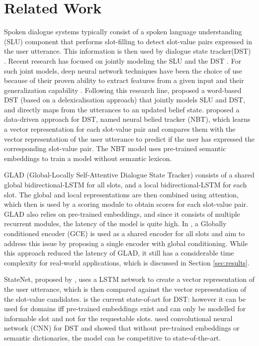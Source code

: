 \documentclass{article}
\begin{document}
\section{Related Work}
\label{sec:rel_work}
Spoken dialogue systems typically consist of a spoken language understanding (SLU) component that performs slot-filling to detect slot-value pairs expressed in the user utterance.
This information is then used by dialogue state tracker(DST) \cite{Wang2013, Sun2015a}.
Recent research has focused on jointly modeling the SLU and the DST \cite{Henderson2014, Wen2017}.
For such joint models, deep neural network techniques have been the choice of use because of their proven ability to extract features from a given input and their generalization capability \cite{Henderson2014, Wen2017, NBT, Ren2018}.
Following this research line, \cite{Henderson2014} proposed a word-based DST (based on a delexicalisation approach) that jointly models SLU and DST, and directly maps from the utterances to an updated belief state.
\cite{NBT} proposed a data-driven approach for DST, named neural belied tracker (NBT), which learns a vector representation for each slot-value pair and compares them with the vector representation of the user utterance to predict if the user has expressed the corresponding slot-value pair.
The NBT model uses pre-trained semantic embeddings to train a model without semantic lexicon.

GLAD (Global-Locally Self-Attentive Dialogue State Tracker) \cite{GLAD} consists of a shared global bidirectional-LSTM \cite{hochreiter1997long} for all slots, and a local bidirectional-LSTM for each slot.
The global and local representations are then combined using attention, which then is used by a scoring module to obtain scores for each slot-value pair.
GLAD also relies on pre-trained embeddings, and since it consists of multiple recurrent modules, the latency of the model is quite high.
In \cite{GCE}, a Globally conditioned encoder (GCE) is used as a shared encoder for all slots and aim to address this issue by proposing a single encoder with global conditioning.
While this approach reduced the latency of GLAD, it still has a considerable time complexity for real-world applications, which is discussed in Section \ref{sec:results}.

StateNet, proposed by \cite{Ren2018}, uses a LSTM network to create a vector representation of the user utterance, which is then compared against the vector representation of the slot-value candidates.
\cite{Ren2018} is the current state-of-art for DST: however it can be used for domains iff pre-trained embeddings exist and can only be modelled for informable slot and not for the requestable slots.
\cite{Mandy2018} used convolutional neural network (CNN) for DST and showed that without pre-trained embeddings or semantic dictionaries, the model can be competitive to state-of-the-art.
\end{document}
